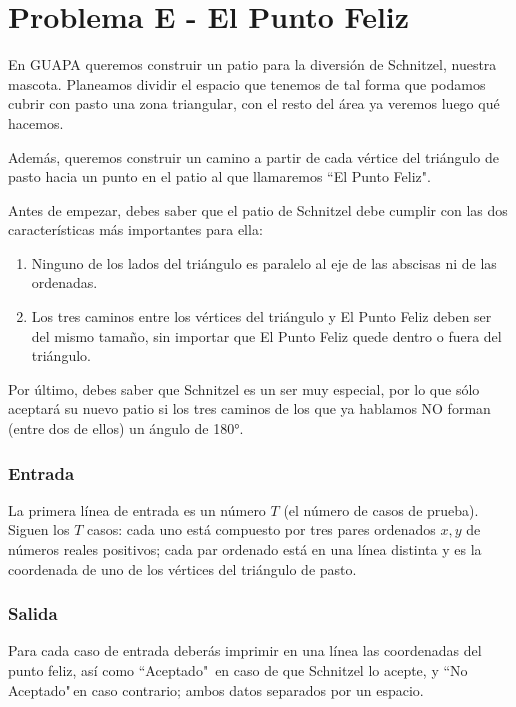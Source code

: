 \chapter*{Problema E - El Punto Feliz}

En GUAPA queremos construir un patio para la diversión de 
Schnitzel, nuestra mascota. Planeamos dividir el espacio 
que tenemos de tal forma que podamos cubrir con pasto una
zona triangular, con el resto del área ya veremos luego 
qué hacemos.

Además, queremos construir un camino a partir de cada
vértice del triángulo de pasto hacia un punto en el patio
al que llamaremos ``El Punto Feliz".

Antes de empezar, debes saber que el patio de Schnitzel 
debe cumplir con las dos características más importantes
para ella:

\begin{enumerate}
    \item Ninguno de los lados del triángulo es paralelo
    al eje de las abscisas ni de las ordenadas.
    \item Los tres caminos entre los vértices del 
    triángulo y El Punto Feliz deben ser del mismo tamaño,
    sin importar que El Punto Feliz quede dentro o fuera
    del triángulo.
\end{enumerate}

Por último, debes saber que Schnitzel es un ser muy 
especial, por lo que sólo aceptará su nuevo patio si los
tres caminos de los que ya hablamos NO forman (entre dos
de ellos) un ángulo de 180°.



\subsection*{Entrada}

La primera línea de entrada es un número $T$ (el número de
casos de prueba). Siguen los $T$ casos: cada uno está
compuesto por tres pares ordenados $x,y$ de números reales 
positivos; cada par ordenado está en una línea distinta y 
es la coordenada de uno de los vértices del triángulo de 
pasto.



\subsection*{Salida}

Para cada caso de entrada deberás imprimir en una línea
las coordenadas del punto feliz, así como ``Aceptado"$\,$
en caso de que Schnitzel lo acepte, y ``No Aceptado"$\,$en 
caso contrario; ambos datos separados por un espacio.

